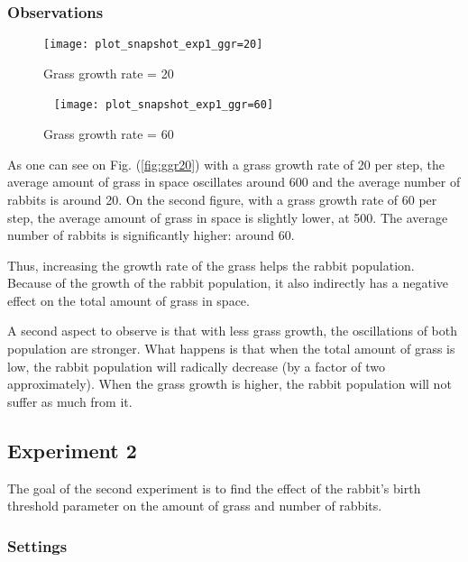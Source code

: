 \documentclass[11pt]{article}
\begin{document}
\subsubsection{Observations}

\begin{figure}[H]
	\centering
	\begin{minipage}{0.49\linewidth}
    	\centering
    	\texttt{[image: plot\_snapshot\_exp1\_ggr=20]}
    	\caption{Grass growth rate = 20}
        \label{fig:ggr20}
	\end{minipage}
    	\begin{minipage}{0.49\linewidth}
    	\centering~
    	\texttt{[image: plot\_snapshot\_exp1\_ggr=60]}
    	\caption{Grass growth rate = 60}
        \label{fig:ggr60}
	\end{minipage}
\end{figure}

As one can see on Fig. (\ref{fig:ggr20}) with a grass growth rate of 20 per step, the average amount of grass in space oscillates around 600 and the average number of rabbits is around 20. On the second figure, with a grass growth rate of 60 per step, the average amount of grass in space is slightly lower, at 500. The average number of rabbits is significantly higher: around 60. 

Thus, increasing the growth rate of the grass helps the rabbit population. Because of the growth of the rabbit population, it also indirectly has a negative effect on the total amount of grass in space.

A second aspect to observe is that with less grass growth, the oscillations of both population are stronger. What happens is that when the total amount of grass is low, the rabbit population will radically decrease (by a factor of two approximately). When the grass growth is higher, the rabbit population will not suffer as much from it.

\subsection{Experiment 2}
The goal of the second experiment is to find the effect of the rabbit's birth threshold parameter on the amount of grass and number of rabbits.

\subsubsection{Settings}
\end{document}
